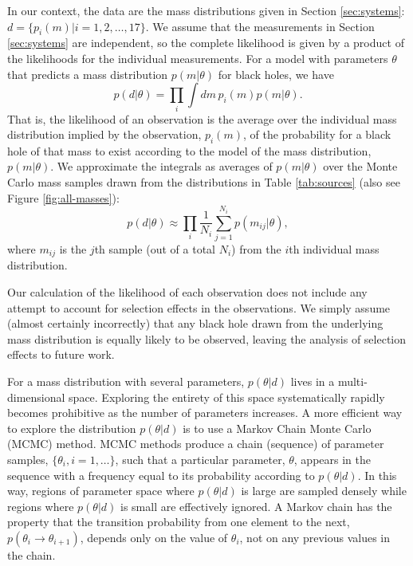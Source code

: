 \documentclass[preprint]{aastex}
\begin{document}
In our context, the data are the mass distributions given in Section
\ref{sec:systems}: $d = \{ p_i(m)| i = 1, 2, \ldots, 17 \}$.  We
assume that the measurements in Section \ref{sec:systems} are
independent, so the complete likelihood is given by a product of the
likelihoods for the individual measurements.  For a model with
parameters $\theta$ that predicts a mass distribution $p(m|\theta)$
for black holes, we have
\begin{equation}
  \label{eq:likelihood-def}
  p(d|\theta) = \prod_i \int dm\, p_i(m) p(m|\theta).
\end{equation}
That is, the likelihood of an observation is the average over the
individual mass distribution implied by the observation, $p_i(m)$, of
the probability for a black hole of that mass to exist according to
the model of the mass distribution, $p(m | \theta)$.  We approximate
the integrals as averages of $p(m|\theta)$ over the Monte Carlo mass
samples drawn from the distributions in Table \ref{tab:sources} (also
see Figure \ref{fig:all-masses}):
\begin{equation}
  p(d|\theta) \approx \prod_i \frac{1}{N_i} \sum_{j = 1}^{N_i} p(m_{ij} | \theta),
\end{equation}
where $m_{ij}$ is the $j$th sample (out of a total $N_i$) from the
$i$th individual mass distribution.

Our calculation of the likelihood of each observation does not include
any attempt to account for selection effects in the observations.  We
simply assume (almost certainly incorrectly) that any black hole drawn
from the underlying mass distribution is equally likely to be
observed, leaving the analysis of selection effects to future work.

For a mass distribution with several parameters, $p(\theta | d)$ lives
in a multi-dimensional space.  Exploring the entirety of this space
systematically rapidly becomes prohibitive as the number of parameters
increases.  A more efficient way to explore the distribution $p(\theta
| d)$ is to use a Markov Chain Monte Carlo (MCMC) method.  MCMC
methods produce a chain (sequence) of parameter samples, $\{ \theta_i,
i = 1, \ldots \}$, such that a particular parameter, $\theta$, appears
in the sequence with a frequency equal to its probability according to
$p(\theta|d)$.  In this way, regions of parameter space where
$p(\theta|d)$ is large are sampled densely while regions where
$p(\theta|d)$ is small are effectively ignored.  A Markov chain has
the property that the transition probability from one element to the
next, $p(\theta_i \to \theta_{i+1})$, depends only on the value of
$\theta_i$, not on any previous values in the chain.
\end{document}
